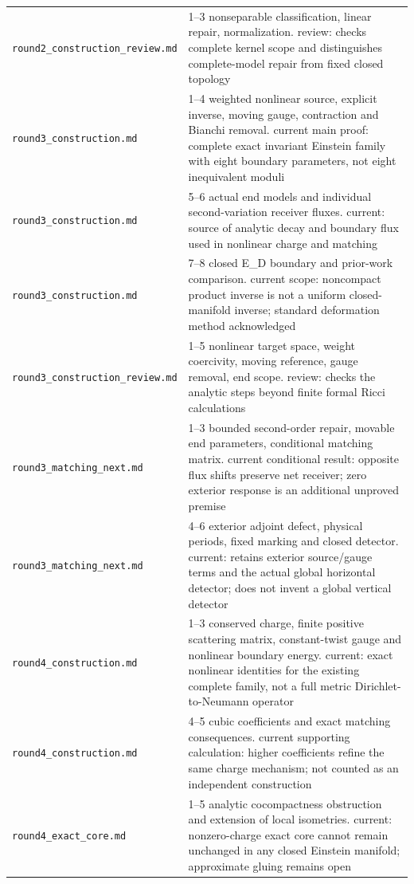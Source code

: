 \documentclass[UTF8,fontset=fandol,zihao=-4]{ctexart}
\theoremstyle{cn}
\begin{document}
\begin{longtable}{L{.34\textwidth}L{.59\textwidth}}
\nolinkurl{round2_construction_review.md} & 1–3 nonseparable classification, linear repair, normalization. review: checks complete kernel scope and distinguishes complete-model repair from fixed closed topology\\
\nolinkurl{round3_construction.md} & 1–4 weighted nonlinear source, explicit inverse, moving gauge, contraction and Bianchi removal. current main proof: complete exact invariant Einstein family with eight boundary parameters, not eight inequivalent moduli\\
\nolinkurl{round3_construction.md} & 5–6 actual end models and individual second-variation receiver fluxes. current: source of analytic decay and boundary flux used in nonlinear charge and matching\\
\nolinkurl{round3_construction.md} & 7–8 closed E\_D boundary and prior-work comparison. current scope: noncompact product inverse is not a uniform closed-manifold inverse; standard deformation method acknowledged\\
\nolinkurl{round3_construction_review.md} & 1–5 nonlinear target space, weight coercivity, moving reference, gauge removal, end scope. review: checks the analytic steps beyond finite formal Ricci calculations\\
\nolinkurl{round3_matching_next.md} & 1–3 bounded second-order repair, movable end parameters, conditional matching matrix. current conditional result: opposite flux shifts preserve net receiver; zero exterior response is an additional unproved premise\\
\nolinkurl{round3_matching_next.md} & 4–6 exterior adjoint defect, physical periods, fixed marking and closed detector. current: retains exterior source/gauge terms and the actual global horizontal detector; does not invent a global vertical detector\\
\nolinkurl{round4_construction.md} & 1–3 conserved charge, finite positive scattering matrix, constant-twist gauge and nonlinear boundary energy. current: exact nonlinear identities for the existing complete family, not a full metric Dirichlet-to-Neumann operator\\
\nolinkurl{round4_construction.md} & 4–5 cubic coefficients and exact matching consequences. current supporting calculation: higher coefficients refine the same charge mechanism; not counted as an independent construction\\
\nolinkurl{round4_exact_core.md} & 1–5 analytic cocompactness obstruction and extension of local isometries. current: nonzero-charge exact core cannot remain unchanged in any closed Einstein manifold; approximate gluing remains open\\

\end{longtable}
\end{document}
